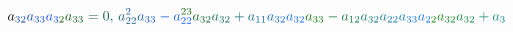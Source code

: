 \documentclass[12pt]{article}
\begin{document}
\begin{displaymath}
{a} _ { \mathcolor[RGB]{15,75,165}{3} \mathcolor[RGB]{15,75,180}{2} } \mathcolor[RGB]{15,75,195}{a} _ { \mathcolor[RGB]{15,75,210}{3} \mathcolor[RGB]{15,75,225}{3} } \mathcolor[RGB]{15,75,240}{a} _ { \mathcolor[RGB]{15,75,255}{3} \mathcolor[RGB]{15,90,0}{2} } \mathcolor[RGB]{15,90,15}{a} _ { \mathcolor[RGB]{15,90,30}{3} \mathcolor[RGB]{15,90,45}{3} } \mathcolor[RGB]{15,90,60}{=} \mathcolor[RGB]{15,90,75}{0} \mathcolor[RGB]{15,90,90}{,} \mathcolor[RGB]{15,90,105}{\,
a} _ { \mathcolor[RGB]{15,90,120}{2} \mathcolor[RGB]{15,90,135}{2} } ^ { \mathcolor[RGB]{15,90,150}{2} } \mathcolor[RGB]{15,90,165}{a} _ { \mathcolor[RGB]{15,90,180}{3} \mathcolor[RGB]{15,90,195}{3} } \mathcolor[RGB]{15,90,210}{-} \mathcolor[RGB]{15,90,225}{a} _ { \mathcolor[RGB]{15,90,240}{2} \mathcolor[RGB]{15,90,255}{2} } ^ { \mathcolor[RGB]{15,105,0}{2} \mathcolor[RGB]{15,105,15}{3} } \mathcolor[RGB]{15,105,30}{a} _ { \mathcolor[RGB]{15,105,45}{3} \mathcolor[RGB]{15,105,60}{2} } \mathcolor[RGB]{15,105,75}{a} _ { \mathcolor[RGB]{15,105,90}{3} \mathcolor[RGB]{15,105,105}{2} } \mathcolor[RGB]{15,105,120}{+} \mathcolor[RGB]{15,105,135}{a} _ { \mathcolor[RGB]{15,105,150}{1} \mathcolor[RGB]{15,105,165}{1} } \mathcolor[RGB]{15,105,180}{a} _ { \mathcolor[RGB]{15,105,195}{3} \mathcolor[RGB]{15,105,210}{2} } \mathcolor[RGB]{15,105,225}{a} _ { \mathcolor[RGB]{15,105,240}{3} \mathcolor[RGB]{15,105,255}{2} } \mathcolor[RGB]{15,120,0}{a} _ { \mathcolor[RGB]{15,120,15}{3} \mathcolor[RGB]{15,120,30}{3} } \mathcolor[RGB]{15,120,45}{-} \mathcolor[RGB]{15,120,60}{a} _ { \mathcolor[RGB]{15,120,75}{1} \mathcolor[RGB]{15,120,90}{2} } \mathcolor[RGB]{15,120,105}{a} _ { \mathcolor[RGB]{15,120,120}{3} \mathcolor[RGB]{15,120,135}{2} } \mathcolor[RGB]{15,120,150}{a} _ { \mathcolor[RGB]{15,120,165}{2} \mathcolor[RGB]{15,120,180}{2} } \mathcolor[RGB]{15,120,195}{a} _ { \mathcolor[RGB]{15,120,210}{3} \mathcolor[RGB]{15,120,225}{3} } \mathcolor[RGB]{15,120,240}{a} _ { \mathcolor[RGB]{15,120,255}{2} \mathcolor[RGB]{15,135,0}{2} } \mathcolor[RGB]{15,135,15}{a} _ { \mathcolor[RGB]{15,135,30}{3} \mathcolor[RGB]{15,135,45}{2} } \mathcolor[RGB]{15,135,60}{a} _ { \mathcolor[RGB]{15,135,75}{3} \mathcolor[RGB]{15,135,90}{2} } \mathcolor[RGB]{15,135,105}{+} \mathcolor[RGB]{15,135,120}{a} _ { \mathcolor[RGB]{15,135,135}{3} } \mathcolor[RGB]{15,135,150}{\,
}
\end{displaymath}
\end{document}
